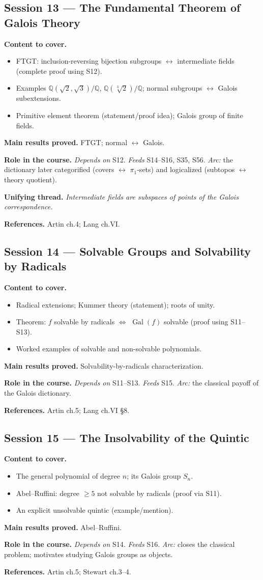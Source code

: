 \documentclass[11pt,a4paper]{article}
\newcommand{\sess}[2]{\subsection[#1. #2]{Session #1 --- #2}}
\newcommand{\chead}{\par\smallskip\noindent\textbf{Content to cover.}}
\newcommand{\proved}[1]{\par\smallskip\noindent\textbf{Main results proved.} #1}
\newcommand{\role}[1]{\par\smallskip\noindent\textbf{Role in the course.} #1}
\newcommand{\thread}[1]{\par\smallskip\noindent\textbf{Unifying thread.} \textit{#1}}
\newcommand{\srefs}[1]{\par\smallskip\noindent\textbf{References.} #1}
\newcommand{\Q}{\mathbb{Q}}
\newcommand{\Gal}{\operatorname{Gal}}
\begin{document}
	\sess{13}{The Fundamental Theorem of Galois Theory}
	\chead
	\begin{itemize}
		\item FTGT: inclusion-reversing bijection subgroups $\leftrightarrow$ intermediate fields (complete proof using S12).
		\item Examples $\Q(\sqrt2,\sqrt3)/\Q$, $\Q(\sqrt[3]{2})/\Q$; normal subgroups $\leftrightarrow$ Galois subextensions.
		\item Primitive element theorem (statement/proof idea); Galois group of finite fields.
	\end{itemize}
	\proved{FTGT; normal $\leftrightarrow$ Galois.}
	\role{\emph{Depends on} S12. \emph{Feeds} S14--S16, S35, S56. \emph{Arc:} the dictionary later categorified (covers $\leftrightarrow$ $\pi_1$-sets) and logicalized (subtopos $\leftrightarrow$ theory quotient).}
	\thread{Intermediate fields are subspaces of points of the Galois correspondence.}
	\srefs{Artin ch.4; Lang ch.VI.}
	
	\sess{14}{Solvable Groups and Solvability by Radicals}
	\chead
	\begin{itemize}
		\item Radical extensions; Kummer theory (statement); roots of unity.
		\item Theorem: $f$ solvable by radicals $\iff$ $\Gal(f)$ solvable (proof using S11--S13).
		\item Worked examples of solvable and non-solvable polynomials.
	\end{itemize}
	\proved{Solvability-by-radicals characterization.}
	\role{\emph{Depends on} S11--S13. \emph{Feeds} S15. \emph{Arc:} the classical payoff of the Galois dictionary.}
	\srefs{Artin ch.5; Lang ch.VI \S8.}
	
	\sess{15}{The Insolvability of the Quintic}
	\chead
	\begin{itemize}
		\item The general polynomial of degree $n$; its Galois group $S_n$.
		\item Abel--Ruffini: degree $\geq5$ not solvable by radicals (proof via S11).
		\item An explicit unsolvable quintic (example/mention).
	\end{itemize}
	\proved{Abel--Ruffini.}
	\role{\emph{Depends on} S14. \emph{Feeds} S16. \emph{Arc:} closes the classical problem; motivates studying Galois groups as objects.}
	\srefs{Artin ch.5; Stewart ch.3--4.}
	
\end{document}
